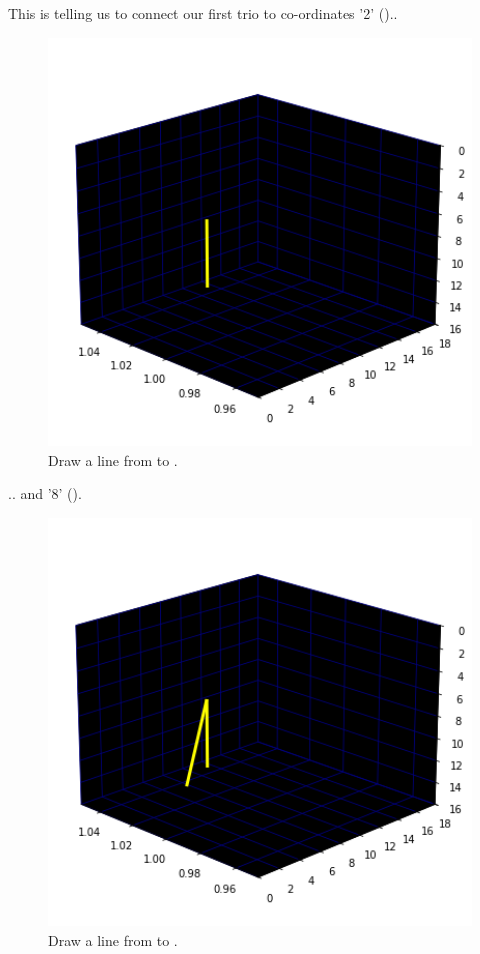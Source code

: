 This is telling us to connect our first trio  to co-ordinates
'2' ()..
\begin{figure}[H]
    \centering
    \begin{adjustbox}{width=7cm,center}
      \includegraphics[width=12cm]{src/claws/build_claw_1_0.png}%
    \end{adjustbox}
  \caption*{Draw a line from  to .}
\end{figure}
.. and '8' ().
\begin{figure}[H]
    \centering
    \begin{adjustbox}{width=7cm,center}
      \includegraphics[width=12cm]{src/claws/build_claw_1_1.png}%
    \end{adjustbox}
  \caption*{Draw a line from  to .}
\end{figure}


